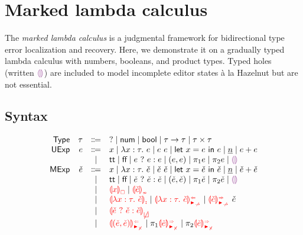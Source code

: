 \documentclass[formalism.tex]{subfiles}
\begin{document}




\section{Marked lambda calculus}
\label{sec:marked}

The \emph{marked lambda calculus} is a judgmental framework for bidirectional type error
localization and recovery. Here, we demonstrate it on a gradually typed lambda calculus with
numbers, booleans, and product types. Typed holes (written $\EEHole$) are included to model
incomplete editor states \`a la Hazelnut but are not essential.

\subsection{Syntax}
\label{sec:marked-syntax}
\[\begin{array}{rrcl}
  \TMName  & \TMV  & \Coloneqq & \TUnknown \mid \TNum \mid \TBool \mid \TArrow{\TMV}{\TMV} \mid \TProd{\TMV}{\TMV} \\
  \EMName  & \EMV  & \Coloneqq & x \mid \ELam{x}{\TMV}{\EMV} \mid \EAp{\EMV}{\EMV} \mid \ELet{x}{\EMV}{\EMV}
                     \mid           \ENumMV \mid \EPlus{\EMV}{\EMV} \\
           &       & \mid         & \ETrue \mid \EFalse \mid \EIf{\EMV}{\EMV}{\EMV}
                     \mid           \EPair{\EMV}{\EMV}
                     \mid           \EProjL{\EMV} \mid \EProjR{\EMV}
                     \mid           \EEHole \\
  \ECMName & \ECMV & \Coloneqq & x \mid \ECLam{x}{\TMV}{\ECMV} \mid \ECAp{\ECMV}{\ECMV} \mid \ECLet{x}{\ECMV}{\ECMV}
                     \mid           \ECNumMV \mid \ECPlus{\ECMV}{\ECMV} \\
           &       & \mid         & \ECTrue \mid \ECFalse \mid \ECIf{\ECMV}{\ECMV}{\ECMV}
                     \mid           \ECPair{\ECMV}{\ECMV} \mid \ECProjL{\ECMV} \mid \ECProjR{\ECMV}
                     \mid           \ECEHole \\
           &       & \mid         & \ECUnbound{x} \mid \ECInconType{\ECMV} \\
           &       & \mid         & \ECLamInconAsc{x}{\TMV}{\ECMV} \mid \ECLamAnaNonMatchedArrow{x}{\TMV}{\ECMV} \mid \ECApSynNonMatchedArrow{\ECMV}{\ECMV} \\
           &       & \mid         & \ECInconBr{\ECMV}{\ECMV}{\ECMV} \\
           &       & \mid         & \ECPairAnaNonMatchedProd{\ECMV}{\ECMV} \mid \ECProjLSynNonMatchedProd{\ECMV} \mid \ECProjRSynNonMatchedProd{\ECMV}
\end{array}\]
\end{document}
